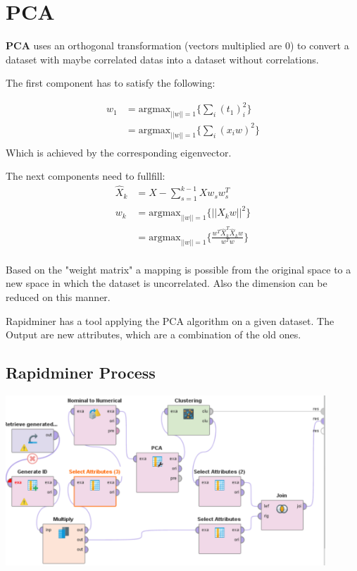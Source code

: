 \section{PCA}


\textbf{PCA} uses an orthogonal transformation (vectors multiplied are 0) to
convert a dataset with maybe correlated datas into a dataset without
correlations.

The first component has to satisfy the following:

\begin{align*}
w_1 &= \text{argmax}_{||w|| = 1} \{\sum_i (t_1)_i^2\}\\
  &= \text{argmax}_{||w|| = 1} \{\sum_i (x_iw)^2\}\\
\end{align*}
Which is achieved by the corresponding eigenvector.

The next components need to fullfill:
\begin{align*}
\hat{X}_k &= X - \sum_{s=1}^{k-1} Xw_sw_s^T\\
w_k &= \text{argmax}_{||w|| = 1} \{||\hat{X}_kw||^2\}\\
  &= \text{argmax}_{||w|| = 1} \{\frac{w^T\hat{X}_k^T\hat{X}_kw}{w^Tw}\}\\
\end{align*}

Based on the "weight matrix" a mapping is possible from the original space to a new space in which the dataset is uncorrelated. Also the dimension can be reduced on this manner.

Rapidminer has a tool applying the PCA algorithm on a given dataset. The Output are 
new attributes, which are a combination of the old ones. 

\subsection{Rapidminer Process}
\includegraphics[width=0.9\textwidth]{PCAClustering}

